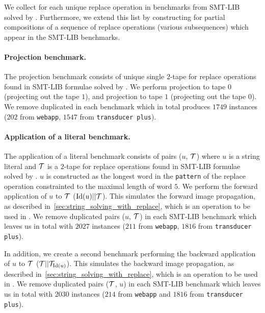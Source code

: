 We collect \nfts for each unique replace operation in benchmarks from SMT-LIB solved by \noodler.
Furthermore, we extend this list by constructing \nfts for partial compositions of a sequence of replace operations (various subsequences) which appear in the SMT-LIB benchmarks.

\paragraph{Projection benchmark.}
The projection benchmark consists of unique single $2$-tape \nfts for replace operations found in SMT-LIB formulae solved by \noodler.
We perform projection to tape $0$ (projecting out the tape $1$), and projection to tape $1$ (projecting out the tape $0$).
We remove duplicated \nfts in each benchmark which in total produces $1749$ instances ($202$ from \texttt{webapp}, $1547$ from \texttt{transducer plus}).

\paragraph{Application of a literal benchmark.}
The application of a literal benchmark consists of pairs ($u$, $\mathcal{T}$) where $u$ is a string literal and $\mathcal{T}$ is a $2$-tape \nft for replace operations found in SMT-LIB formulae solved by \noodler.
$u$ is constructed as the longest word in the \texttt{pattern} of the replace operation constrainted to the maximal length of word $5$.
We perform the forward application of $u$ to $\mathcal{T}$ ($\text{Id}(u) || \mathcal{T} $).
This simulates the forward image propagation, as described in~\ref{sec:string_solving_with_replace}, which is an operation to be used in \noodler.
We remove duplicated pairs ($u$, $\mathcal{T}$) in each SMT-LIB benchmark which leaves us in total with $2027$ instances ($211$ from \texttt{webapp}, $1816$ from \texttt{transducer plus}).

In addition, we create a second benchmark performing the backward application of $u$ to $\mathcal{T}$ ($ \mathcal{T} || \mathcal{T}_{\text{Id}(u)}$).
This simulates the backward image propagation, as described in~\ref{sec:string_solving_with_replace}, which is an operation to be used in \noodler.
We remove duplicated pairs ($\mathcal{T}$, $u$) in each SMT-LIB benchmark which leaves us in total with $2030$ instances ($214$ from \texttt{webapp} and $1816$ from \texttt{transducer plus}).

